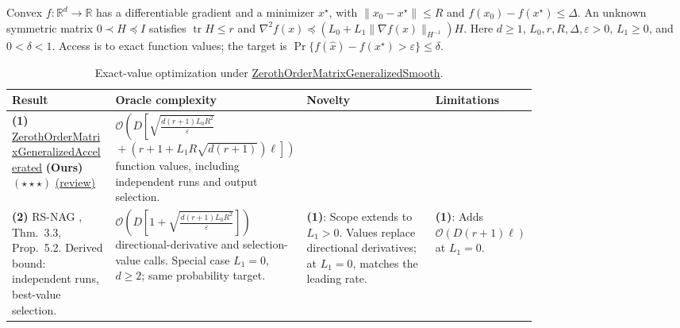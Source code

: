 \begin{table}[tp]
\centering
\caption{Exact-value optimization under \href{https://github.com/k3nfalt/longtails/blob/main/LongTails/Setups/ZerothOrderMatrixGeneralizedSmooth.lean}{ZerothOrderMatrixGeneralizedSmooth}.}\label{tab:ZerothOrderMatrixGeneralizedSmooth}
\parbox{\linewidth}{\footnotesize Convex $f:\mathbb{R}^d\to\mathbb{R}$ has a differentiable gradient and a minimizer $x^\star$, with $\|x_0-x^\star\|\le R$ and $f(x_0)-f(x^\star)\le\Delta$. An unknown symmetric matrix $0\prec H\preceq I$ satisfies $\operatorname{tr}H\le r$ and $\nabla^2f(x)\preceq(L_0+L_1\|\nabla f(x)\|_{H^{-1}})H$. Here $d\ge1$, $L_0,r,R,\Delta,\varepsilon>0$, $L_1\ge0$, and $0<\delta<1$. Access is to exact function values; the target is $\Pr\{f(\hat x)-f(x^\star)>\varepsilon\}\le\delta$.}\par\smallskip
\begin{threeparttable}
\footnotesize
\setlength{\tabcolsep}{4pt}\renewcommand{\arraystretch}{1.25}
\begin{tabularx}{\linewidth}{@{}>{\raggedright\arraybackslash}p{0.20\linewidth}>{\raggedright\arraybackslash}p{0.32\linewidth}>{\raggedright\arraybackslash}p{0.25\linewidth}>{\raggedright\arraybackslash}X@{}}
\toprule
\textbf{Result} & \textbf{Oracle complexity} & \textbf{Novelty} & \textbf{Limitations} \\
\midrule
\textbf{(1)} \href{https://github.com/k3nfalt/longtails/blob/main/LongTails/Theorems/ZerothOrderMatrixGeneralizedAccelerated.lean}{Zeroth\allowbreak Order\allowbreak Matrix\allowbreak Generalized\allowbreak Accelerated} \textbf{(Ours)} $(\star\star\star)$ \href{https://github.com/k3nfalt/longtails/blob/main/scripts/reviews/ZerothOrderMatrixGeneralizedAccelerated.md}{(review)}
& $\mathcal{O}\!\left(D\left[\sqrt{\frac{d(r+1)L_0R^2}{\varepsilon}}\right.\right.$\newline
$\left.\left.{}+(r+1+L_1R\sqrt{d(r+1)})\ell\right]\right)$ function values, including independent runs and output selection.
& & \\
\midrule[1.2pt]
\textbf{(2)} RS-NAG \citep{zmgsOmiya2026v1}, Thm.~3.3, Prop.~5.2. Derived bound: independent runs, best-value selection.
& $\mathcal{O}\!\left(D\left[1+\sqrt{\frac{d(r+1)L_0R^2}{\varepsilon}}\right]\right)$ directional-derivative and selection-value calls. Special case $L_1=0$, $d\ge2$; same probability target.
& \textbf{(1)}: Scope extends to $L_1>0$. Values replace directional derivatives; at $L_1=0$, matches the leading rate.
& \textbf{(1)}: Adds $\mathcal{O}(D(r+1)\ell)$ at $L_1=0$. \\

\end{tabularx}
\end{threeparttable}
\end{table}
